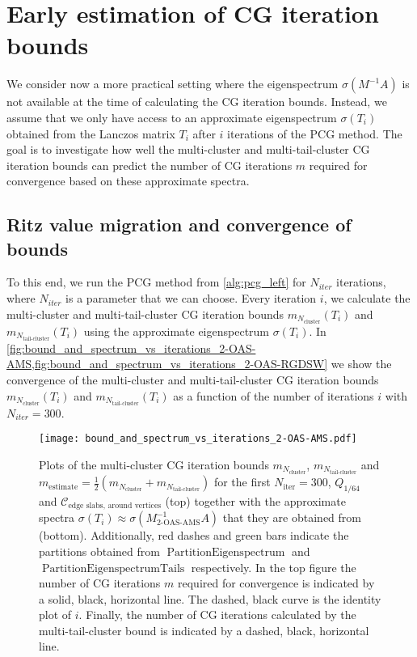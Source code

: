 \section{Early estimation of CG iteration bounds}\label{sec:early_estimation_of_iterations}
We consider now a more practical setting where the eigenspectrum $\sigma(M^{-1}A)$ is not available at the time of calculating the CG iteration bounds. Instead, we assume that we only have access to an approximate eigenspectrum $\sigma(T_i)$ obtained from the Lanczos matrix $T_i$ after $i$ iterations of the PCG method. The goal is to investigate how well the multi-cluster and multi-tail-cluster CG iteration bounds can predict the number of CG iterations $m$ required for convergence based on these approximate spectra.

\subsection{Ritz value migration and convergence of bounds}\label{sec:ritz_value_migration}
To this end, we run the PCG method from \cref{alg:pcg_left} for $N_{iter}$ iterations, where $N_{iter}$ is a parameter that we can choose. Every iteration $i$, we calculate the multi-cluster and multi-tail-cluster CG iteration bounds $m_{N_{\text{cluster}}}(T_i)$ and $m_{N_{\text{tail-cluster}}}(T_i)$ using the approximate eigenspectrum $\sigma(T_i)$. In \cref{fig:bound_and_spectrum_vs_iterations_2-OAS-AMS,fig:bound_and_spectrum_vs_iterations_2-OAS-RGDSW} we show the convergence of the multi-cluster and multi-tail-cluster CG iteration bounds $m_{N_{\text{cluster}}}(T_i)$ and $m_{N_{\text{tail-cluster}}}(T_i)$ as a function of the number of iterations $i$ with $N_{iter}=300$.
\begin{figure}[H]
    \centering
    \texttt{[image: bound\_and\_spectrum\_vs\_iterations\_2-OAS-AMS.pdf]}
    \caption{Plots of the multi-cluster CG iteration bounds $m_{N_{\text{cluster}}}$, $m_{N_{\text{tail-cluster}}}$ and $m_{\text{estimate}} = \frac{1}{2}(m_{N_{\text{cluster}}} + m_{N_{\text{tail-cluster}}})$ for the first $N_{\text{iter}}=300$, $Q_{1/64}$ and $\mathcal{C}_{\text{edge slabs, around vertices}}$ (top) together with the approximate spectra $\sigma(T_i) \approx \sigma(M^{-1}_{\text{2-OAS-AMS}}A)$ that they are obtained from (bottom). Additionally, red dashes and green bars indicate the partitions obtained from $\operatorname{PartitionEigenspectrum}$ and $\operatorname{PartitionEigenspectrumTails}$ respectively. In the top figure the number of CG iterations $m$ required for convergence is indicated by a solid, black, horizontal line. The dashed, black curve is the identity plot of $i$. Finally, the number of CG iterations calculated by the multi-tail-cluster bound is indicated by a dashed, black, horizontal line.}
    \label{fig:bound_and_spectrum_vs_iterations_2-OAS-AMS}
\end{figure}
